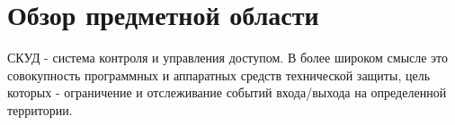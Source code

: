 \section{Обзор предметной области} 

СКУД - система контроля и управления доступом. В более широком смысле это совокупность программных и аппаратных средств технической защиты, цель которых - ограничение и отслеживание событий входа/выхода на определенной территории.




